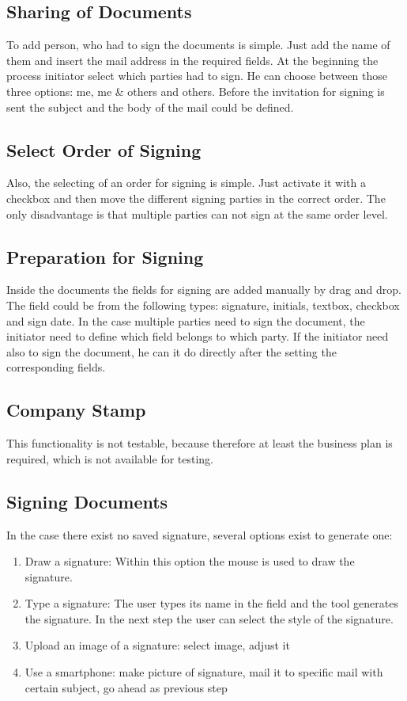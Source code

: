 \subsection{Sharing of Documents}
To add person, who had to sign the documents is simple. Just add the name of them and insert the mail address in the required fields. At the beginning the process initiator select which parties had to sign. He can choose between those three options: me, me \& others and others. Before the invitation for signing is sent the subject and the body of the mail could be defined.


\subsection{Select Order of Signing}
Also, the selecting of an order for signing is simple. Just activate it with a checkbox and then move the different signing parties in the correct order. The only disadvantage is that multiple parties can not sign at the same order level.

\subsection{Preparation for Signing}
Inside the documents the fields for signing are added manually by drag and drop. The field could be from the following types: signature, initials, textbox, checkbox and sign date. In the case multiple parties need to sign the document, the initiator need to define which field belongs to which party. If the initiator need also to sign the document, he can it do directly after the setting the corresponding fields. 

\subsection{Company Stamp}
This functionality is not testable, because therefore at least the business plan is required, which is not available for testing.

\subsection{Signing Documents}
In the case there exist no saved signature, several options exist to generate one:
\begin{enumerate}
	\item Draw a signature: Within this option the mouse is used to draw the signature.
	\item Type a signature: The user types its name in the field and the tool generates the signature. In the next step the user can select the style of the signature.
	\item Upload an image of a signature: select image, adjust it
	\item Use a smartphone: make picture of signature, mail it to specific mail with certain subject, go ahead as previous step
\end{enumerate}

